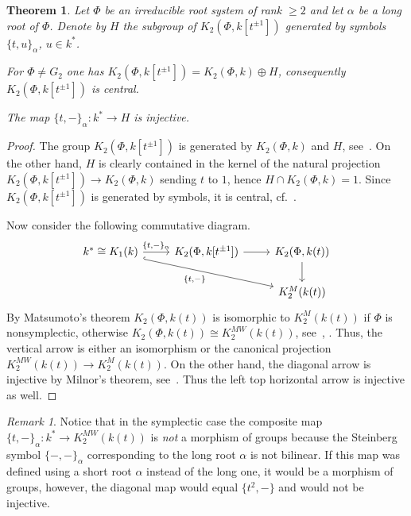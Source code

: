\documentclass[oneside,12pt]{amsart}
\newtheorem{thm}{Theorem}
\numberwithin{equation}{section}
\numberwithin{lem}{section}
\theoremstyle{definition}
\theoremstyle{remark}
\newtheorem{rem}[lem]{Remark}
\begin{document}
\begin{thm}\label{thm:k[t+-1]}
Let $\Phi$ be an irreducible root system of rank $\geq 2$ and let $\alpha$ be a long root of $\Phi$.
Denote by $H$ the subgroup of $K_2(\Phi, k[t^{\pm 1}])$ generated by symbols $\{t,u\}_\alpha$, $u\in k^*$.
\begin{thmlist}
 \item For $\Phi\neq G_2$ one has $K_2(\Phi,k[t^{\pm 1}])=K_2(\Phi,k)\oplus H$, consequently $K_2(\Phi, k[t^{\pm 1}])$ is central.
 \item The map $\{t, -\}_\alpha \colon k^* \to H$ is injective.
\end{thmlist}

\end{thm}
\begin{proof}
The group $K_2(\Phi,k[t^{\pm 1}])$ is generated by $K_2(\Phi,k)$ and $H$, see~\cite[Korollar~4]{Hur77}. 
On the other hand, $H$ is clearly contained in the kernel of the natural projection $K_2(\Phi,k[t^{\pm 1}])\to K_2(\Phi,k)$ sending $t$ to $1$, hence $H\cap K_2(\Phi,k)=1$. 
Since $K_2(\Phi,k[t^{\pm 1}])$ is generated by symbols, it is central, cf.~\cite[\S~2]{Hur77}.
 
Now consider the following commutative diagram.
\[\begin{tikzcd} k^* \cong K_1(k) \ar[r, "{\{t, -\}_\alpha}"] \ar[hookrightarrow, rrd, "{\{t,-\}}"'] & K_2(\Phi, k[t^{\pm 1}]) \ar[r] & K_2(\Phi, k(t))\ar[d] \\
                                                                               &                                 & K_2^M(k(t)) \end{tikzcd}\]
By Matsumoto's theorem $K_2(\Phi, k(t))$ is isomorphic to $K_2^M(k(t))$ if $\Phi$ is nonsymplectic, otherwise $K_2(\Phi, k(t))\cong K_2^{MW}(k(t))$, see~\cite[Corollaire~5.11]{Ma69}, \cite[\S~6]{Sus87}.
Thus, the vertical arrow is either an isomorphism or the canonical projection $K_2^{MW}(k(t))\to K_2^M(k(t))$.
On the other hand, the diagonal arrow is injective by Milnor's theorem, see~\cite[\S~2]{Mil70}. Thus the left top horizontal arrow is injective as well.
\end{proof}

\begin{rem} Notice that in the symplectic case the composite map $\{t, -\}_\alpha\colon k^*\to K_2^{MW}(k(t))$ is \emph{not} a morphism of groups
because the Steinberg symbol $\{-, -\}_\alpha$ corresponding to the long root $\alpha$ is not bilinear.
If this map was defined using a short root $\alpha$ instead of the long one, it would be a morphism of groups, 
 however, the diagonal map would equal $\{t^2,-\}$ and would not be injective. \end{rem}
\end{document}
